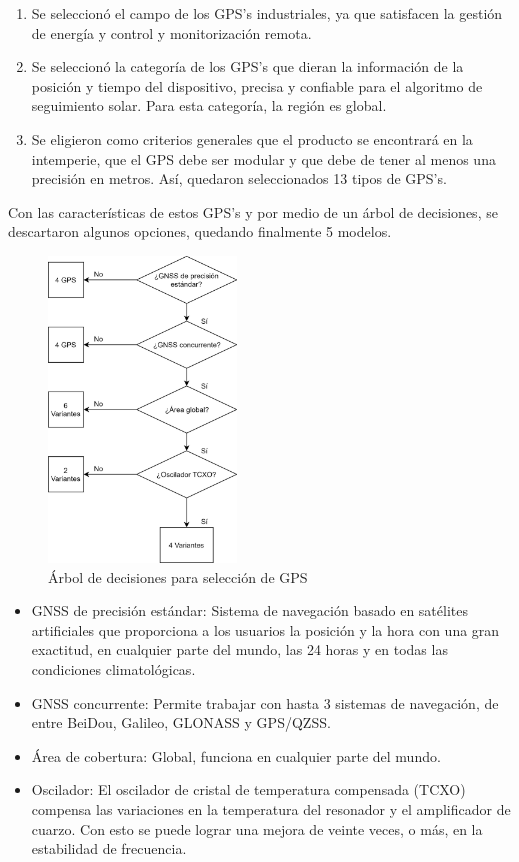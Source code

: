 \begin{enumerate}
    \item Se seleccionó el campo de los GPS's industriales, ya que satisfacen la gestión de energía y control y monitorización remota.
    \item Se seleccionó la categoría de los GPS's que dieran la información de la posición y tiempo del dispositivo, precisa y confiable para el algoritmo de seguimiento solar. Para esta categoría, la región es global.
    \item Se eligieron como criterios generales que el producto se encontrará en la intemperie, que el GPS debe ser modular y que debe de tener al menos una precisión en metros. Así, quedaron seleccionados 13 tipos de GPS's.
\end{enumerate}

Con las características de estos GPS's y por medio de un árbol de decisiones, se descartaron algunos opciones, quedando finalmente 5 modelos.
\begin{figure}[H]
	\centering
	\includegraphics[width=5cm]{imagenes/GPS5}
	\caption{Árbol de decisiones para selección de GPS}
	\label{fig:gps5}
\end{figure}
	
\begin{itemize}
	\item GNSS de precisión estándar: Sistema de navegación basado en satélites artificiales que proporciona a los usuarios la posición y la hora con una gran exactitud, en cualquier parte del mundo, las 24 horas y en todas las condiciones climatológicas.
		
	\item GNSS concurrente: Permite trabajar con hasta 3 sistemas de navegación, de entre BeiDou, Galileo, GLONASS y GPS/QZSS.
		
	\item Área de cobertura: Global, funciona en cualquier parte del mundo.
		
	\item Oscilador: El oscilador de cristal de temperatura compensada (TCXO) compensa las variaciones en la temperatura del resonador y el amplificador de cuarzo. Con esto se puede lograr una mejora de veinte veces, o más, en la estabilidad de frecuencia.
\end{itemize}
	
